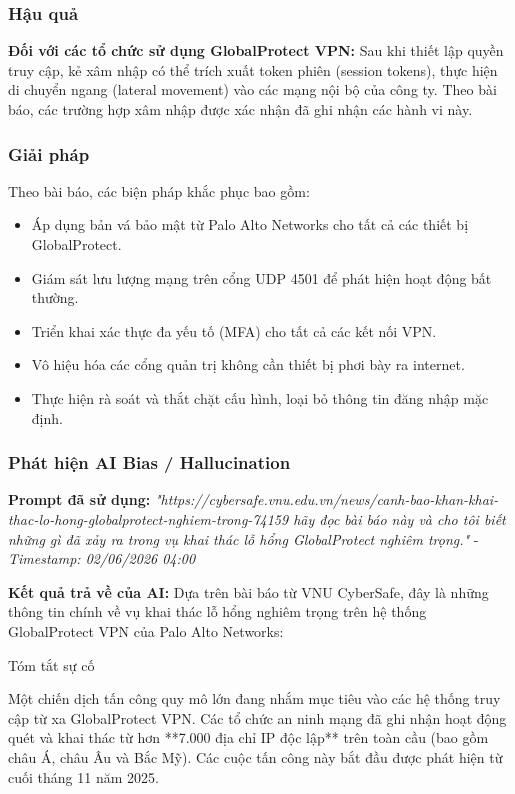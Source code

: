 \subsubsection{Hậu quả}
\textbf{Đối với các tổ chức sử dụng GlobalProtect VPN:} Sau khi thiết lập quyền truy cập, kẻ xâm nhập có thể trích xuất token phiên (session tokens), thực hiện di chuyển ngang (lateral movement) vào các mạng nội bộ của công ty. Theo bài báo, các trường hợp xâm nhập được xác nhận đã ghi nhận các hành vi này.

\subsubsection{Giải pháp}
Theo bài báo, các biện pháp khắc phục bao gồm:

\begin{itemize}
    \item Áp dụng bản vá bảo mật từ Palo Alto Networks cho tất cả các thiết bị GlobalProtect.
    \item Giám sát lưu lượng mạng trên cổng UDP 4501 để phát hiện hoạt động bất thường.
    \item Triển khai xác thực đa yếu tố (MFA) cho tất cả các kết nối VPN.
    \item Vô hiệu hóa các cổng quản trị không cần thiết bị phơi bày ra internet.
    \item Thực hiện rà soát và thắt chặt cấu hình, loại bỏ thông tin đăng nhập mặc định.
\end{itemize}

\subsubsection{Phát hiện AI Bias / Hallucination}

\textbf{Prompt đã sử dụng:} \textit{"{https://cybersafe.vnu.edu.vn/news/canh-bao-khan-khai-thac-lo-hong-globalprotect-nghiem-trong-74159} hãy đọc bài báo này và cho tôi biết những gì đã xảy ra trong vụ khai thác lỗ hổng GlobalProtect nghiêm trọng."} - \textit{Timestamp: 02/06/2026 04:00}

\textbf{Kết quả trả về của AI:}
Dựa trên bài báo từ VNU CyberSafe, đây là những thông tin chính về vụ khai thác lỗ hổng nghiêm trọng trên hệ thống GlobalProtect VPN của Palo Alto Networks:

Tóm tắt sự cố

Một chiến dịch tấn công quy mô lớn đang nhắm mục tiêu vào các hệ thống truy cập từ xa GlobalProtect VPN. Các tổ chức an ninh mạng đã ghi nhận hoạt động quét và khai thác từ hơn **7.000 địa chỉ IP độc lập** trên toàn cầu (bao gồm châu Á, châu Âu và Bắc Mỹ). Các cuộc tấn công này bắt đầu được phát hiện từ cuối tháng 11 năm 2025.

